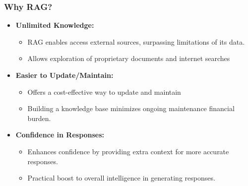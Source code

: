
\begin{frame}[fragile]\frametitle{Why RAG?}
\begin{itemize}
  \item \textbf{Unlimited Knowledge:}
    \begin{itemize}
      \item RAG enables access external sources, surpassing limitations of its data.
      \item Allows exploration of proprietary documents and internet searches%
    \end{itemize}
  
  \item \textbf{Easier to Update/Maintain:}
    \begin{itemize}
      \item Offers a cost-effective way to update and maintain %
      \item Building a knowledge base minimizes ongoing maintenance financial burden.
    \end{itemize}
	
  \item \textbf{Confidence in Responses:}
    \begin{itemize}
      \item Enhances confidence by providing extra context for more accurate responses.
      \item Practical boost to overall intelligence in generating responses.
    \end{itemize}	




\end{itemize}
\end{frame}
